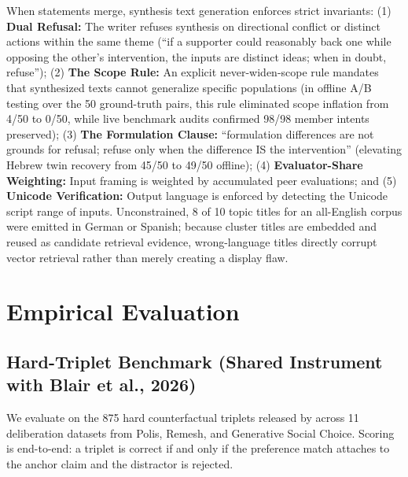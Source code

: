 \documentclass{article}
\begin{document}
When statements merge, synthesis text generation enforces strict invariants: (1) \textbf{Dual Refusal:} The writer refuses synthesis on directional conflict or distinct actions within the same theme (``if a supporter could reasonably back one while opposing the other's intervention, the inputs are distinct ideas; when in doubt, refuse''); (2) \textbf{The Scope Rule:} An explicit never-widen-scope rule mandates that synthesized texts cannot generalize specific populations (in offline A/B testing over the 50 ground-truth pairs, this rule eliminated scope inflation from 4/50 to 0/50, while live benchmark audits confirmed 98/98 member intents preserved); (3) \textbf{The Formulation Clause:} ``formulation differences are not grounds for refusal; refuse only when the difference IS the intervention'' (elevating Hebrew twin recovery from 45/50 to 49/50 offline); (4) \textbf{Evaluator-Share Weighting:} Input framing is weighted by accumulated peer evaluations; and (5) \textbf{Unicode Verification:} Output language is enforced by detecting the Unicode script range of inputs. Unconstrained, 8 of 10 topic titles for an all-English corpus were emitted in German or Spanish; because cluster titles are embedded and reused as candidate retrieval evidence, wrong-language titles directly corrupt vector retrieval rather than merely creating a display flaw.

\section{Empirical Evaluation}

\subsection{Hard-Triplet Benchmark (Shared Instrument with Blair et al., 2026)}
\label{sec:triplets}

We evaluate on the 875 hard counterfactual triplets released by \citet{blair2026embeddings} across 11 deliberation datasets from Polis, Remesh, and Generative Social Choice. Scoring is end-to-end: a triplet is correct if and only if the preference match attaches to the anchor claim and the distractor is rejected.
\end{document}
